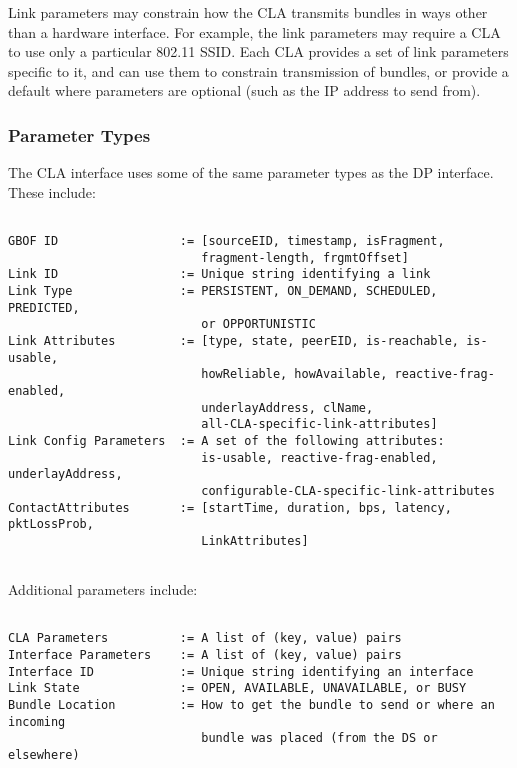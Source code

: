Link parameters may constrain how the CLA transmits bundles in ways other
than a hardware interface. For example, the link parameters may require a
CLA to use only a particular 802.11 SSID. Each CLA provides a set of link
parameters specific to it, and can use them to constrain transmission of
bundles, or provide a default where parameters are optional (such as the IP
address to send from).

\subsubsection{Parameter Types}

The CLA interface uses some of the same parameter types as the DP
interface. These include:

\begin{verbatim}

GBOF ID                 := [sourceEID, timestamp, isFragment,
                           fragment-length, frgmtOffset]
Link ID                 := Unique string identifying a link
Link Type               := PERSISTENT, ON_DEMAND, SCHEDULED, PREDICTED,
                           or OPPORTUNISTIC
Link Attributes         := [type, state, peerEID, is-reachable, is-usable,
                           howReliable, howAvailable, reactive-frag-enabled,
                           underlayAddress, clName,
                           all-CLA-specific-link-attributes]
Link Config Parameters  := A set of the following attributes:
                           is-usable, reactive-frag-enabled, underlayAddress,
                           configurable-CLA-specific-link-attributes
ContactAttributes       := [startTime, duration, bps, latency, pktLossProb,
                           LinkAttributes]


\end{verbatim}

Additional parameters include:

\begin{verbatim}

CLA Parameters          := A list of (key, value) pairs
Interface Parameters    := A list of (key, value) pairs
Interface ID            := Unique string identifying an interface
Link State              := OPEN, AVAILABLE, UNAVAILABLE, or BUSY
Bundle Location         := How to get the bundle to send or where an incoming 
                           bundle was placed (from the DS or elsewhere)

\end{verbatim}

